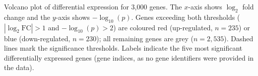 \caption{Volcano plot of differential expression for 3{,}000 genes. The $x$-axis shows $\log_2$ fold change and the $y$-axis shows $-\log_{10}(p)$. Genes exceeding both thresholds ($|\log_2\text{FC}|>1$ and $-\log_{10}(p)>2$) are coloured red (up-regulated, $n=235$) or blue (down-regulated, $n=230$); all remaining genes are grey ($n=2{,}535$). Dashed lines mark the significance thresholds. Labels indicate the five most significant differentially expressed genes (gene indices, as no gene identifiers were provided in the data).}
